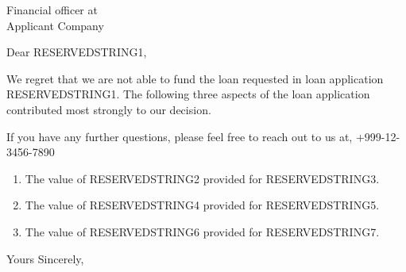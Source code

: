 \documentclass{letter}
\begin{document}
	
\address{%
	ACME Superior Lending Co. --TOTALLY FAKE\\
	12345 Common Road\\
    Somewhere on Earth 98765}
\signature{John Doe\\
	Sr. Loan Officer \\
	Review Department\\
    ACME Superior Lending Co.}



\begin{letter}{Financial officer at\\
	 Applicant Company}  %

\opening{Dear RESERVEDSTRING1,}

We regret that we are not able to fund the loan requested in loan application RESERVEDSTRING1.  The following three aspects of the loan application contributed most strongly to our decision.


If you have any further questions, please feel free to reach out to us at, +999-12-3456-7890

\begin{enumerate}
	\item  The value of RESERVEDSTRING2 provided for RESERVEDSTRING3.
	\item  The value of RESERVEDSTRING4 provided for RESERVEDSTRING5.
	\item  The value of RESERVEDSTRING6 provided for RESERVEDSTRING7.
\end{enumerate}

\closing{Yours Sincerely,}

\end{letter}
\end{document}
